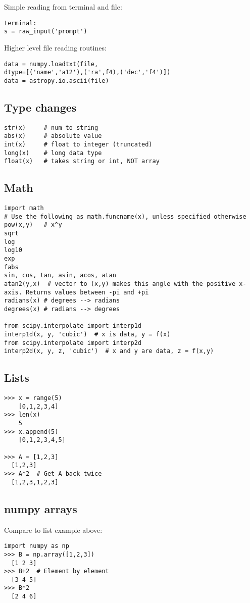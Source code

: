 \documentclass{article}
\begin{document}
\begin{multicols}{2}
Simple reading from terminal and file:
\begin{lstlisting}
terminal:
s = raw_input('prompt')
\end{lstlisting}

Higher level file reading routines:
\begin{lstlisting}
data = numpy.loadtxt(file,
dtype=[('name','a12'),('ra',f4),('dec','f4')])
data = astropy.io.ascii(file)
\end{lstlisting}

\subsection{Type changes}
\begin{lstlisting}
str(x)     # num to string
abs(x)     # absolute value
int(x)     # float to integer (truncated)
long(x)    # long data type
float(x)   # takes string or int, NOT array
\end{lstlisting}
\vfill
\columnbreak

\subsection{Math}
\begin{lstlisting}
import math
# Use the following as math.funcname(x), unless specified otherwise
pow(x,y)   # x^y
sqrt
log
log10
exp
fabs
sin, cos, tan, asin, acos, atan
atan2(y,x)  # vector to (x,y) makes this angle with the positive x-axis. Returns values between -pi and +pi
radians(x) # degrees --> radians
degrees(x) # radians --> degrees

from scipy.interpolate import interp1d
interp1d(x, y, 'cubic')  # x is data, y = f(x)
from scipy.interpolate import interp2d
interp2d(x, y, z, 'cubic')  # x and y are data, z = f(x,y)
\end{lstlisting}

\subsection{Lists}
\begin{lstlisting}
>>> x = range(5)
    [0,1,2,3,4]
>>> len(x)
    5
>>> x.append(5)
    [0,1,2,3,4,5]

>>> A = [1,2,3]
  [1,2,3]
>>> A*2  # Get A back twice
  [1,2,3,1,2,3]
\end{lstlisting}

\subsection{numpy arrays}
Compare to list example above:
\begin{lstlisting}
import numpy as np
>>> B = np.array([1,2,3])
  [1 2 3]
>>> B+2  # Element by element
  [3 4 5]
>>> B*2
  [2 4 6]


\end{lstlisting}
\end{multicols}
\end{document}
